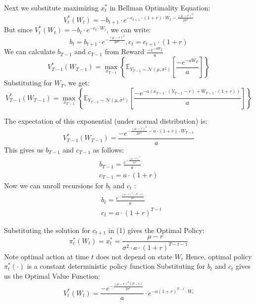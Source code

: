 \documentclass[11pt]{article}
\begin{document}
Next we substitute maximizing $x_t^*$ in Bellman Optimality Equation:
$$
V_t^*\left(W_t\right)=-b_{t+1} \cdot e^{-c_{t+1} \cdot(1+r) \cdot W_t-\frac{(\mu-r)^2}{2 \sigma^2}}
$$
But since $V_t^*\left(W_t\right)=-b_t \cdot e^{-c_t \cdot W_t}$, we can write:
$$
b_t=b_{t+1} \cdot e^{-\frac{(\mu-r)^2}{2 \sigma^2}}, c_t=c_{t+1} \cdot(1+r)
$$
We can calculate $b_{T-1}$ and $c_{T-1}$ from Reward $\frac{-e^{-a W_T}}{a}$
$$
V_{T-1}^*\left(W_{T-1}\right)=\max _{x_{T-1}}\left\{\mathbb{E}_{Y_{T-1} \sim \mathcal{N}\left(\mu, \sigma^2\right)}\left[\frac{-e^{-a W_T}}{a}\right]\right\}
$$
Substituting for $W_T$, we get:
$$
V_{T-1}^*\left(W_{T-1}\right)=\max _{x_{T-1}}\left\{\mathbb{E}_{Y_{T-1} \sim \mathcal{N}\left(\mu, \sigma^2\right)}\left[\frac{-e^{-a\left(x_{T-1} \cdot\left(Y_{T-1}-r\right)+W_{T-1} \cdot(1+r)\right)}}{a}\right]\right\}
$$

The expectation of this exponential (under normal distribution) is:
$$
V_{T-1}^*\left(W_{T-1}\right)=\frac{-e^{-\frac{(\mu-r)^2}{2 \sigma^2}-a \cdot(1+r) \cdot W_{T-1}}}{a}
$$
This gives us $b_{T-1}$ and $c_{T-1}$ as follows:
$$
\begin{gathered}
b_{T-1}=\frac{e^{-\frac{(\mu-r)^2}{2 \sigma^2}}}{a} \\
c_{T-1}=a \cdot(1+r)
\end{gathered}
$$
Now we can unroll recursions for $b_t$ and $c_t$ :
$$
\begin{aligned}
& b_t=\frac{e^{-\frac{(\mu-r)^2 \cdot(T-t)}{2 \sigma^2}}}{a} \\
& c_t=a \cdot(1+r)^{T-t}
\end{aligned}
$$

Substituting the solution for $c_{t+1}$ in (1) gives the Optimal Policy:
$$
\pi_t^*\left(W_t\right)=x_t^*=\frac{\mu-r}{\sigma^2 \cdot a \cdot(1+r)^{T-t-1}}
$$
Note optimal action at time $t$ does not depend on state $W_t$
Hence, optimal policy $\pi_t^*(\cdot)$ is a constant deterministic policy function Substituting for $b_t$ and $c_t$ gives us the Optimal Value Function:
$$
V_t^*\left(W_t\right)=\frac{-e^{-\frac{(\mu-r)^2(T-t)}{2 \sigma^2}}}{a} \cdot e^{-a(1+r)^{T-t} \cdot W_t}
$$
\end{document}
